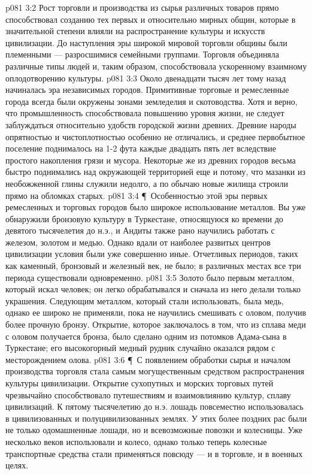 \vs p081 3:2 Рост торговли и производства из сырья различных товаров прямо способствовал созданию тех первых и относительно мирных общин, которые в значительной степени влияли на распространение культуры и искусств цивилизации. До наступления эры широкой мировой торговли общины были племенными --- разросшимися семейными группами. Торговля объединяла различные типы людей и, таким образом, способствовала ускоренному взаимному оплодотворению культуры.
\vs p081 3:3 Около двенадцати тысяч лет тому назад начиналась эра независимых городов. Примитивные торговые и ремесленные города всегда были окружены зонами земледелия и скотоводства. Хотя и верно, что промышленность способствовала повышению уровня жизни, не следует заблуждаться относительно удобств городской жизни древних. Древние народы опрятностью и чистоплотностью особенно не отличались, и среднее первобытное поселение поднималось на 1\hyp{}2 фута каждые двадцать пять лет вследствие простого накопления грязи и мусора. Некоторые же из древних городов весьма быстро поднимались над окружающей территорией еще и потому, что мазанки из необожженной глины служили недолго, а по обычаю новые жилища строили прямо на обломках старых.
\vs p081 3:4 \P\ Особенностью этой эры первых ремесленных и торговых городов было широкое использование металлов. Вы уже обнаружили бронзовую культуру в Туркестане, относящуюся ко времени до девятого тысячелетия до н.э., и Андиты также рано научились работать с железом, золотом и медью. Однако вдали от наиболее развитых центров цивилизации условия были уже совершенно иные. Отчетливых периодов, таких как каменный, бронзовый и железный век, не было; в различных местах все три периода существовали одновременно.
\vs p081 3:5 Золото было первым металлом, который искал человек; он легко обрабатывался и сначала из него делали только украшения. Следующим металлом, который стали использовать, была медь, однако ее широко не применяли, пока не научились смешивать с оловом, получив более прочную бронзу. Открытие, которое заключалось в том, что из сплава меди с оловом получается бронза, было сделано одним из потомков Адама\hyp{}сына в Туркестане; его высокогорный медный рудник случайно оказался рядом с месторождением олова.
\vs p081 3:6 \P\ С появлением обработки сырья и началом производства торговля стала самым могущественным средством распространения культуры цивилизации. Открытие сухопутных и морских торговых путей чрезвычайно способствовало путешествиям и взаимовлиянию культур, сплаву цивилизаций. К пятому тысячелетию до н.э. лошадь повсеместно использовалась в цивилизованных и полуцивилизованных землях. У этих более поздних рас были не только одомашненные лошади, но и всевозможные повозки и колесницы. Уже несколько веков использовали и колесо, однако только теперь колесные транспортные средства стали применяться повсюду --- и в торговле, и в военных целях.

